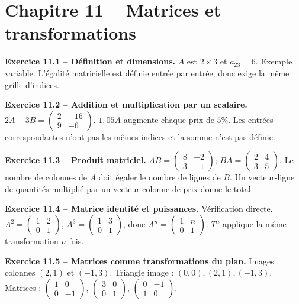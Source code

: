 \chapter*{Chapitre 11 -- Matrices et transformations}
\begin{answerbox}
\textbf{Exercice 11.1 -- Définition et dimensions.} $A$ est $2\times3$ et $a_{23}=6$. Exemple variable. L'égalité matricielle est définie entrée par entrée, donc exige la même grille d'indices.\par
\textbf{Exercice 11.2 -- Addition et multiplication par un scalaire.} $2A-3B=\begin{pmatrix}2&-16\\9&-6\end{pmatrix}$. $1{,}05A$ augmente chaque prix de $5\%$. Les entrées correspondantes n'ont pas les mêmes indices et la somme n'est pas définie.\par
\textbf{Exercice 11.3 -- Produit matriciel.} $AB=\begin{pmatrix}8&-2\\3&-1\end{pmatrix}$; $BA=\begin{pmatrix}2&4\\3&5\end{pmatrix}$. Le nombre de colonnes de $A$ doit égaler le nombre de lignes de $B$. Un vecteur-ligne de quantités multiplié par un vecteur-colonne de prix donne le total.\par
\textbf{Exercice 11.4 -- Matrice identité et puissances.} Vérification directe. $A^2=\begin{pmatrix}1&2\\0&1\end{pmatrix}$, $A^3=\begin{pmatrix}1&3\\0&1\end{pmatrix}$, donc $A^n=\begin{pmatrix}1&n\\0&1\end{pmatrix}$. $T^n$ applique la même transformation $n$ fois.\par
\textbf{Exercice 11.5 -- Matrices comme transformations du plan.} Images : colonnes $(2,1)$ et $(-1,3)$. Triangle image : $(0,0),(2,1),(-1,3)$. Matrices : $\begin{pmatrix}1&0\\0&-1\end{pmatrix}$, $\begin{pmatrix}3&0\\0&1\end{pmatrix}$, $\begin{pmatrix}0&-1\\1&0\end{pmatrix}$.\par

\end{answerbox}
